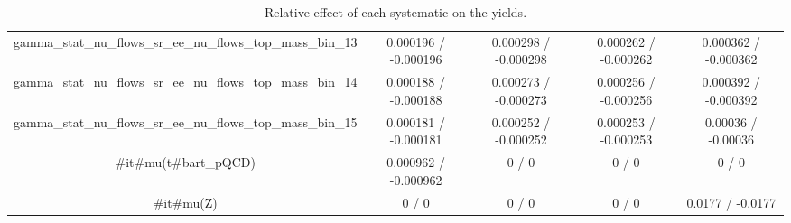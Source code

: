 \documentclass[10pt]{article}
\begin{document}
\begin{table}[htbp]
\begin{center}
\begin{tabular}{|c|c|c|c|c|}
  gamma_stat_nu_flows_sr_ee_nu_flows_top_mass_bin_13 & 0.000196 / -0.000196 & 0.000298 / -0.000298 & 0.000262 / -0.000262 & 0.000362 / -0.000362 \\ 
  gamma_stat_nu_flows_sr_ee_nu_flows_top_mass_bin_14 & 0.000188 / -0.000188 & 0.000273 / -0.000273 & 0.000256 / -0.000256 & 0.000392 / -0.000392 \\ 
  gamma_stat_nu_flows_sr_ee_nu_flows_top_mass_bin_15 & 0.000181 / -0.000181 & 0.000252 / -0.000252 & 0.000253 / -0.000253 & 0.00036 / -0.00036 \\ 
  #it{#mu}(t#bar{t}_{pQCD}) & 0.000962 / -0.000962 & 0 / 0 & 0 / 0 & 0 / 0 \\ 
  #it{#mu}(Z) & 0 / 0 & 0 / 0 & 0 / 0 & 0.0177 / -0.0177 \\ 
\hline 
\end{tabular} 
\caption{Relative effect of each systematic on the yields.} 
\end{center} 
\end{table} 
\end{document}
